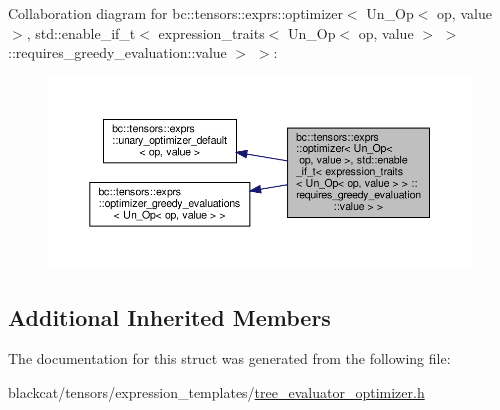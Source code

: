 Collaboration diagram for bc\+:\+:tensors\+:\+:exprs\+:\+:optimizer$<$ Un\+\_\+\+Op$<$ op, value $>$, std\+:\+:enable\+\_\+if\+\_\+t$<$ expression\+\_\+traits$<$ Un\+\_\+\+Op$<$ op, value $>$ $>$ \+:\+:requires\+\_\+greedy\+\_\+evaluation\+:\+:value $>$ $>$\+:\nopagebreak
\begin{figure}[H]
\begin{center}
\leavevmode
\includegraphics[width=350pt]{structbc_1_1tensors_1_1exprs_1_1optimizer_3_01Un__Op_3_01op_00_01value_01_4_00_01std_1_1enable__a326777cb4644e77f46d1119bad8f56a}
\end{center}
\end{figure}
\subsection*{Additional Inherited Members}


The documentation for this struct was generated from the following file\+:\begin{DoxyCompactItemize}
\item 
blackcat/tensors/expression\+\_\+templates/\hyperlink{tree__evaluator__optimizer_8h}{tree\+\_\+evaluator\+\_\+optimizer.\+h}\end{DoxyCompactItemize}
